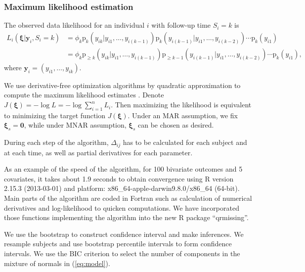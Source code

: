 \documentclass[12pt]{article}
\newcommand{\pr}{\mbox{p}}
\begin{document}
\subsubsection{Maximum likelihood estimation}
\label{ch3:sec:mle}

The observed data likelihood for an individual $i$ with follow-up time
$S_i = k$ is
\begin{align} \label{eq:ll} L_i(\bm \xi| \bm y_i, S_{i} = k) & =
  \phi_k\pr_k (y_{ik} | y_{i1}, \ldots, y_{i(k-1)})
  \pr_k (y_{i(k-1)}|y_{i1}, \ldots, y_{i(k-2)}) \cdots \pr_{k} (y_{i1}) \\
  & = \phi_k \pr_{\geq k} (y_{ik} | y_{i1}, \ldots, y_{i(k-1)}) \pr_{\geq k-1}
  (y_{i(k-1)}|y_{i1}, \ldots, y_{i(k-2)}) \cdots \pr_{k} (y_{i1}), \nonumber
\end{align}
where $\bm y_i = (y_{i1}, \ldots, y_{ik})$.

We use derivative-free optimization algorithms by quadratic
approximation to compute the maximum likelihood estimates
\citep{minqa}. Denote $J(\bm \xi) = - \log L = - \log \sum_{i =
  1}^n L_i$.  Then maximizing the likelihood is equivalent to minimizing
the target function $J(\bm \xi)$. Under an MAR assumption, we fix
$\bm \xi_s = \bm 0$, while under MNAR assumption, $\bm \xi_s
$ can be chosen as desired.

During each step of the algorithm, $\Delta_{ij}$ has to be calculated
for each subject and at each time, as well as partial derivatives for
each parameter.

As an example of the speed of the algorithm, for 100 bivariate outcomes and 5 covariates,
it takes about 1.9 seconds to obtain convergence using R version 2.15.3 (2013-03-01) \citep{R} and platform: x86\_64-apple-darwin9.8.0/x86\_64 (64-bit).
Main parts of the algorithm are coded in Fortran such as calculation of numerical derivatives and log-likelihood to quicken computations.
We have incorporated those functions implementing the algorithm into the new R \citep{R} package ``qrmissing''.

We use the bootstrap \citep{efron1993} to
construct confidence interval and make inferences.  We resample
subjects and use bootstrap percentile intervals to form confidence
intervals.  We use the
 BIC criterion to select the number of components in the mixture of normals in (\ref{eq:model}).

\end{document}
